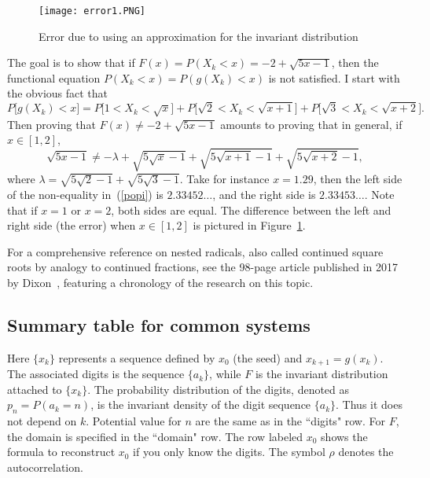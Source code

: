 \documentclass[oneside,10pt]{book}
\begin{document}
\begin{figure}[H]
\centering
\texttt{[image: error1.PNG]} %
\caption{Error due to using an approximation for the invariant distribution}
\label{err32}
\end{figure}

The goal is to show that if $F(x)=P(X_k<x) = -2+\sqrt{5x-1}$, then the functional equation $P(X_k<x) = P(g(X_k)<x)$ is not satisfied.
I start with the obvious fact that
$$ P\Big[g(X_k)< x\Big] = P\Big[1<X_k<\sqrt{x}\Big] + P\Big[\sqrt{2}<X_k<\sqrt{x+1}\Big] + P\Big[\sqrt{3}<X_k<\sqrt{x+2}\Big].$$
Then proving that $F(x) \neq -2+\sqrt{5x-1}$ amounts to proving that in general, if $x\in [1, 2]$,
\begin{equation}
\sqrt{5x-1} \neq -\lambda + \sqrt{5\sqrt{x}-1} + \sqrt{5\sqrt{x+1}-1} + \sqrt{5\sqrt{x+2}-1},\label{popi}
\end{equation}
where $\lambda = \sqrt{5\sqrt{2}-1} +  \sqrt{5\sqrt{3}-1}$. Take for instance $x=1.29$, then
the left side of the non-equality in~(\ref{popi}) is $2.33452\dots$, and the right side is $2.33453\dots$. Note that
 if $x=1$ or $x=2$, both sides are equal. The difference between the left and right side (the error) when $x\in[1,2]$ is pictured
 in Figure~\ref{err32}.

For a comprehensive reference on nested radicals, also called continued square roots by analogy to continued fractions, see the 98-page article published in 2017 by
Dixon~\cite{sccf17}, featuring a chronology of the research on this topic.


\subsection{Summary table for common systems}\label{sunbvc}

Here $\{x_k\}$ represents a sequence defined by $x_0$ (the \textcolor{index}{seed}) and $x_{k+1}=g(x_k)$. The associated \textcolor{index}{digits} is the sequence $\{a_k\}$,
 while $F$ is the \textcolor{index}{invariant distribution} attached to $\{x_k\}$.
 The probability distribution
 of the digits, denoted as $p_n = P(a_k=n)$, is the invariant density of the digit sequence $\{a_k\}$.
 Thus it does not depend on $k$. Potential value for $n$ are the same as in the ``digits" row. For $F$,
 the domain is specified in the ``domain" row. The row labeled $x_0$ shows the formula
 to reconstruct $x_0$ if you only know the digits.
The symbol $\rho$ denotes the autocorrelation.
\end{document}
